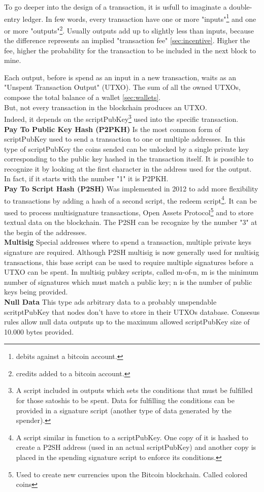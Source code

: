 To go deeper into the design of a transaction, it is usfull to imaginate a double-entry
ledger. In few words, every transaction have one or more "inputs"\footnote{debits 
against a bitcoin account.} and one or more "outputs"\footnote{credits added to a bitcoin 
account.}. Usually outputs add up to slightly less than inputs, because the difference
represents an implied "transaction fee" \ref{sec:incentive}. Higher the fee, higher the 
probability for the transaction to be included in the next block to mine.

Each output, before is spend as an input in a new transaction, waits as an "Unspent
Transaction Output" (UTXO). The sum of all the owned UTXOs, compose the total balance
of a wallet \ref{sec:wallets}.\\
But, not every transaction in the blockchain produces an UTXO.\\ 
Indeed, it depends on 
the scriptPubKey\footnote{A script included in outputs which sets the conditions that 
must be fulfilled for those satoshis to be spent. Data for fulfilling the conditions 
can be provided in a signature script (another type of data generated by the spender).}
used into the specific transaction.
\bigskip\\
\textbf{Pay To Public Key Hash (P2PKH)} 
Is the most common form of scriptPubKey used to send a transaction to one or multiple 
addresses. In this type of scriptPubKey the coins sended can be unlocked by a single 
private key corresponding to the public key hashed in the transaction itself. It is 
possible to recognize it by looking at the first character in the address used for the
output. In fact, if it starts with the number "1" it is P2PKH.\cite{bitcoin.org}
\bigskip\\
\textbf{Pay To Script Hash (P2SH)}
Was implemented in 2012 to add more flexibility to transactions by adding a hash 
of a second script, the redeem script\footnote{A script similar in function to a 
scriptPubKey. One copy of it is hashed to create a P2SH address (used in an actual 
scriptPubKey) and another copy is placed in the spending signature script to enforce 
its conditions.}. It can be used to process multisignature transactions, 
Open Assets Protocol\footnote{Used to create new currencies upon the Bitcoin blockchain. 
Called colored coins} and to store textual data on the blockchain. The P2SH can be 
recognize by the number "3" at the begin of the addresses.\cite{bitcoin.org}
\bigskip\\
\textbf{Multisig}
Special addresses where to spend a transaction, multiple private keys signature are required.
Although P2SH multisig is now generally used for multisig transactions, this base 
script can be used to require multiple signatures before a UTXO can be spent.
In multisig pubkey scripts, called m-of-n, m is the minimum number of signatures 
which must match a public key; n is the number of public keys being provided.\cite{bitcoin.org}
\bigskip\\
\textbf{Null Data}
This type ads arbitrary data to a probably unspendable scritptPubKey that nodes don't have
to store in their UTXOs database. Consesus rules allow null data outputs up to the maximum
allowed scriptPubKey size of 10.000 bytes provided.\cite{bitcoin.org}

